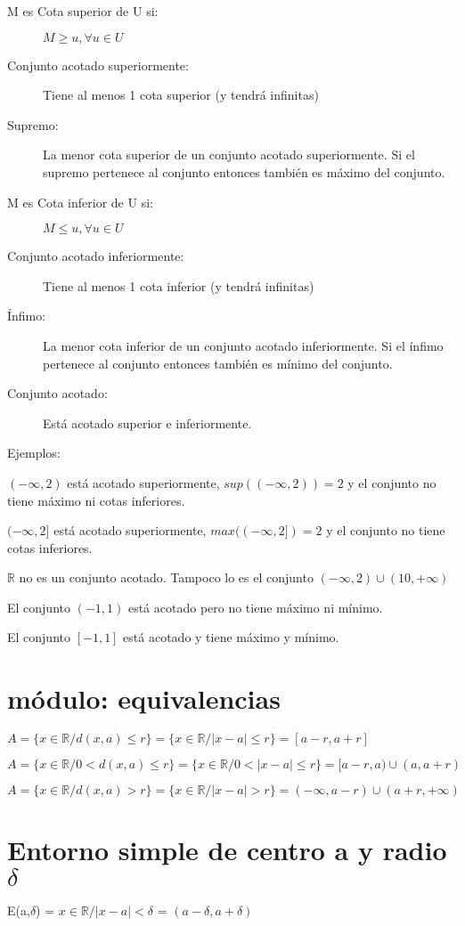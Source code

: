 \documentclass{report}
\begin{document}
\begin{description}
	\item[M es Cota superior de U si:] $M \geq u, \forall u \in U$
	\item[Conjunto acotado superiormente:] Tiene al menos 1 cota superior (y tendrá infinitas)
	\item[Supremo:] La menor cota superior de un conjunto acotado superiormente. Si el supremo pertenece al conjunto entonces también es máximo del conjunto.
	\item[M es Cota inferior de U si:] $M \leq u, \forall u \in U$
	\item[Conjunto acotado inferiormente:] Tiene al menos 1 cota inferior (y tendrá infinitas)
	\item[Ínfimo:] La menor cota inferior de un conjunto acotado inferiormente. Si el ínfimo pertenece al conjunto entonces también es mínimo del conjunto.
	\item[Conjunto acotado:] Está acotado superior e inferiormente.
\end{description}

Ejemplos: 

$(-\infty,2)$ está acotado superiormente, $sup((-\infty,2))=2$ y el conjunto no tiene máximo ni cotas inferiores.

$(-\infty,2]$ está acotado superiormente, $max((-\infty,2])=2$ y el conjunto no tiene cotas inferiores.

$\mathbb{R}$ no es un conjunto acotado. Tampoco lo es el conjunto $(-\infty,2) \cup (10, +\infty)$

El conjunto $(-1,1)$ está acotado pero no tiene máximo ni mínimo.

El conjunto $[-1,1]$ está acotado y tiene máximo y mínimo.

	\section{módulo: equivalencias}
	
	$A = \{x \in \mathbb{R} / d(x, a) \leq r\} = \{x \in \mathbb{R} / |x-a| \leq r\} = [a-r,a+r]$
	
	$A = \{x \in \mathbb{R} / 0 < d(x, a) \leq r\} = \{x \in \mathbb{R} / 0 < |x-a| \leq r\} = [a-r,a) \cup (a,a+r)$
	
	$A = \{x \in \mathbb{R} / d(x, a)>r\} = \{x \in \mathbb{R} / |x-a|>r\} = (-\infty, a-r) \cup (a+r,+\infty)$
	
	\section{Entorno simple de centro a y radio $\delta$}
		E(a,$\delta$) = {$x \in \mathbb{R} / |x-a|<\delta$} = $(a-\delta,a+\delta)$
		
\end{document}
